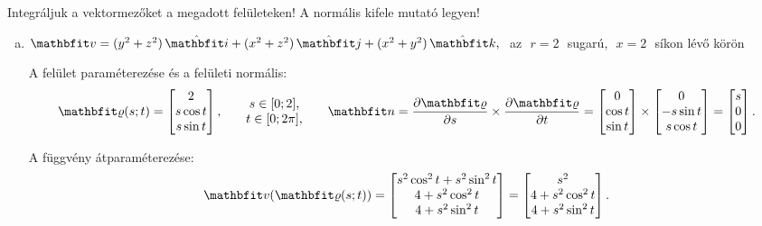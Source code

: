\documentclass[exercise]{math-standalone}
\begin{document}
\begin{exercise}{%
    Integráljuk a vektormezőket a megadott felületeken!
    A normális kifele mutató legyen!
  }
{\begin{enumerate}[a)]
      \item $\rvec v = \ijk{y^2 + z^2}{x^2 + z^2}{x^2 + y^2}, \,\,$ az $\,\,r = 2\,\,$ sugarú, $\,\,x = 2\,\,$ síkon lévő körön

            A felület paraméterezése és a felületi normális:
            \[
              \surfv(s;t)
              =
              \begin{bmatrix}
                2 \\ s \cos t \\ s \sin t
              \end{bmatrix}
              \text,
              \qquad
              \begin{matrix}
                s \in [0;2] \text, \\
                t \in [0;2\pi] \text,
              \end{matrix}
              \qquad
              \rvec n
              =
              \pdv{\surfv}{s} \times \pdv{\surfv}{t}
              =
              \begin{bmatrix}
                0 \\ \cos t \\ \sin t
              \end{bmatrix}
              \times
              \begin{bmatrix}
                0 \\ - s \sin t \\ s \cos t
              \end{bmatrix}
              =
              \begin{bmatrix}
                s \\ 0 \\ 0
              \end{bmatrix}
              \text.
            \]

            A függvény átparaméterezése:
            \[
              \rvec v (\surfv (s;t))
              =
              \begin{bmatrix}
                s^2 \cos^2 t + s^2 \sin^2 t \\
                4 + s^2 \cos^2 t            \\
                4 + s^2 \sin^2 t
              \end{bmatrix}
              =
              \begin{bmatrix}
                s^2              \\
                4 + s^2 \cos^2 t \\
                4 + s^2 \sin^2 t
              \end{bmatrix}
              \text.
            \]


\end{enumerate}}
\end{exercise}
\end{document}

